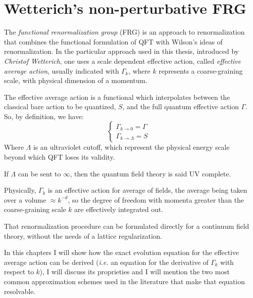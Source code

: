 
   \chapter{Wetterich's non-perturbative FRG}
\noindent
The \emph{functional renormalization group} (FRG) is an approach to renormalization that combines the functional 
formulation of QFT with Wilson's ideas of renormalization. In the particular approach used in this thesis, introduced 
by \emph{Christof Wetterich}\cite{wetterichprimo}, one uses a scale dependent effective action, called 
\emph{effective average action}, usually indicated with $\Gamma_k$, where $k$ represents a coarse-graining scale, with physical dimension of a momentum.

The effective average action is 
a functional which interpolates between the classical bare action to be quantized, $S$, and the full quantum effective action $\Gamma$.
So, by definition, we have:
\begin{displaymath}
\left\{
\begin{array}{l}
 \Gamma_{k\rightarrow 0} = \Gamma\\
 \Gamma_{k\rightarrow \Lambda} = S
\end{array}
\right.
\end{displaymath}
Where $\Lambda$ is an ultraviolet cutoff, which represent the physical energy scale beyond which  QFT loses its validity.

If $\Lambda$ can be sent to $\infty$, then the quantum field theory is said UV complete.

Physically, $\Gamma_k$ is an effective action for average of fields, the average being taken over a volume $\approx k^{-d}$, 
so the degree of freedom with momenta greater than the coarse-graining scale $k$ are effectively integrated out. 

That renormalization procedure can be formulated directly for a continuum field theory, 
without the needs of a lattice regularization. 

In this chapters I will show how the exact evolution equation for the effective average action can be derived (\emph{i.e.} 
an equation for the derivative of $\Gamma_k$ with respect to $k$), I will discuss its proprieties  and I will mention the two
most common approximation schemes used in the literature that make that equation resolvable. 

